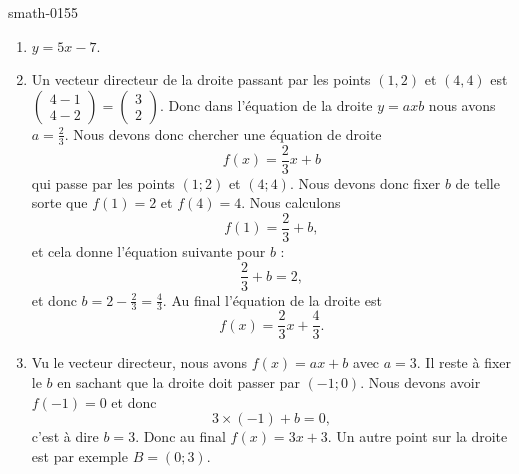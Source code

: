 
\begin{corrige}{smath-0155}

    \begin{enumerate}
        \item
            \( y=5x-7\).
        \item
            Un vecteur directeur de la droite passant par les points $(1,2)$ et $(4,4)$ est \( \begin{pmatrix}
                4-1    \\ 
                4-2    
            \end{pmatrix}=\begin{pmatrix}
                3    \\ 
                2    
            \end{pmatrix}\). Donc dans l'équation de la droite \( y=axb\) nous avons \( a=\frac{ 2 }{ 3 }\). Nous devons donc chercher une équation de droite 
            \begin{equation}
                f(x)=\frac{ 2 }{ 3 }x+b
            \end{equation}
            qui passe par les points \( (1;2)\) et \( (4;4)\). Nous devons donc fixer \( b\) de telle sorte que \( f(1)=2\) et \( f(4)=4\). Nous calculons
            \begin{equation}
                f(1)=\frac{ 2 }{ 3 }+b,
            \end{equation}
            et cela donne l'équation suivante pour \( b\) :
            \begin{equation}
                \frac{ 2 }{ 3 }+b=2,
            \end{equation}
            et donc \( b=2-\frac{ 2 }{ 3 }=\frac{ 4 }{ 3 }\). Au final l'équation de la droite est
            \begin{equation}
                f(x)=\frac{ 2 }{ 3 }x+\frac{ 4 }{ 3 }.
            \end{equation}
        \item
            Vu le vecteur directeur, nous avons \( f(x)=ax+b\) avec \( a=3\). Il reste à fixer le \( b\) en sachant que la droite doit passer par \( (-1;0)\). Nous devons avoir \( f(-1)=0\) et donc
            \begin{equation}
                3\times (-1)+b=0,
            \end{equation}
            c'est à dire \( b=3\). Donc au final \( f(x)=3x+3\). Un autre point sur la droite est par exemple \( B=(0;3)\).
            
    \end{enumerate}

\end{corrige}
